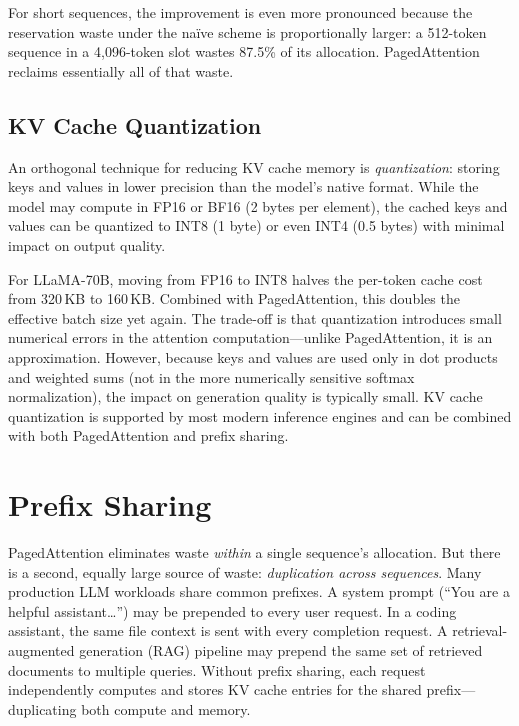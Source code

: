For short sequences, the improvement is even more pronounced because the reservation waste under the na\"ive scheme is proportionally larger: a 512-token sequence in a 4,096-token slot wastes 87.5\% of its allocation. PagedAttention reclaims essentially all of that waste.

\subsection{KV Cache Quantization}

%
An orthogonal technique for reducing KV cache memory is \emph{quantization}: storing keys and values in lower precision than the model's native format. While the model may compute in FP16 or BF16 (2 bytes per element), the cached keys and values can be quantized to INT8 (1 byte) or even INT4 (0.5 bytes) with minimal impact on output quality.

For LLaMA-70B, moving from FP16 to INT8 halves the per-token cache cost from 320\,KB to 160\,KB. Combined with PagedAttention, this doubles the effective batch size yet again. The trade-off is that quantization introduces small numerical errors in the attention computation---unlike PagedAttention, it is an approximation. However, because keys and values are used only in dot products and weighted sums (not in the more numerically sensitive softmax normalization), the impact on generation quality is typically small. KV cache quantization is supported by most modern inference engines and can be combined with both PagedAttention and prefix sharing.

\section{Prefix Sharing}
\label{sec:kvcache:prefix}

%
PagedAttention eliminates waste \emph{within} a single sequence's allocation. But there is a second, equally large source of waste: \emph{duplication across sequences}. Many production LLM workloads share common prefixes. A system prompt (``You are a helpful assistant\ldots'') may be prepended to every user request. In a coding assistant, the same file context is sent with every completion request. A retrieval-augmented generation (RAG) pipeline may prepend the same set of retrieved documents to multiple queries. Without prefix sharing, each request independently computes and stores KV cache entries for the shared prefix---duplicating both compute and memory.

